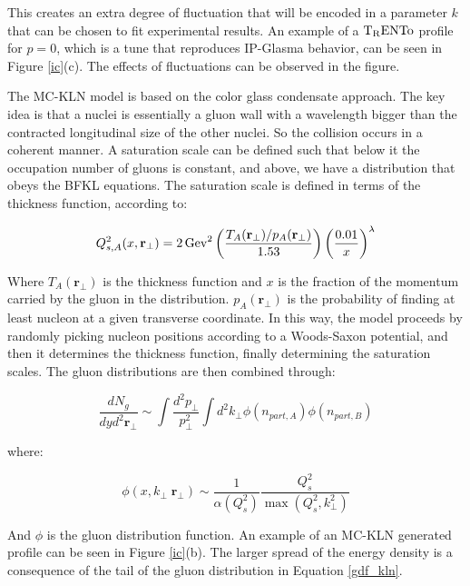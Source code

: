 This creates an extra degree of fluctuation that will be encoded in a parameter $k$ that can be chosen to fit experimental results. An example of a $\rm T_RENTo$ profile for $p=0$, which is a tune that reproduces IP-Glasma behavior, can be seen in Figure \ref{ic}(c). The effects of fluctuations can be observed in the figure.

 \label{mckln}

The MC-KLN\cite{drescher_effects_2007} model is based on the color glass condensate approach. The key idea is that a nuclei is essentially a gluon wall with a wavelength bigger than the contracted longitudinal size of the other nuclei. So the collision occurs in a coherent manner. A saturation scale can be defined such that below it the occupation number of gluons is constant, and above, we have a distribution that obeys the BFKL equations\cite{kovchegov_quantum_2012}. The saturation scale is defined in terms of the thickness function, according to:

\begin{equation}
Q_{s,A}^{2} (x, \textbf{r}_{\perp}) = 2 \, {\rm Gev}^2 \left( \frac{T_A (\textbf{r}_{\perp}) / p_A(\textbf{r}_{\perp}) }{1.53} \right) \left( \frac{0.01}{x} \right)^{\lambda}
\end{equation}

Where $T_A (\textbf{r}_{\perp})$ is the thickness function and $x$ is the fraction of the momentum carried by the gluon in the distribution. $p_A({\mathbf{r}_{\perp}})$ is the probability of finding at least nucleon at a given transverse coordinate. In this way, the model proceeds by randomly picking nucleon positions according to a Woods-Saxon potential, and then it determines the thickness function, finally determining the saturation scales. The gluon distributions are then combined through:

\begin{equation}
\frac{dN_g}{dyd^2\textbf{r}_{\perp}} \sim \int \frac{d^2p_{\perp}}{p^2_{\perp}} \int d^2 k_{\perp} \phi (n_{part,A}) \phi (n_{part,B})
\end{equation}

where:

\begin{equation}
\phi(x,k_{\perp}\;\textbf{r}_{\perp}) \sim \frac{1}{\alpha(Q_s^2)} \frac{Q_s^2}{\max (Q_s^2,k_{\perp}^2)}
\label{gdf_kln}
\end{equation}

And $\phi$ is the gluon distribution function. An example of an MC-KLN generated profile can be seen in Figure \ref{ic}(b). The larger spread of the energy density is a consequence of the tail of the gluon distribution in Equation \eqref{gdf_kln}.

